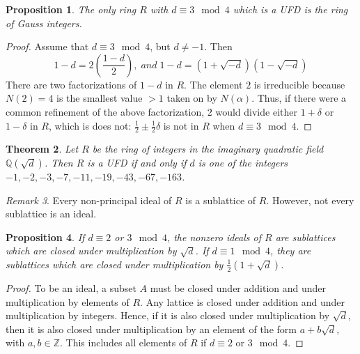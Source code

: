 \documentclass[12pt]{article}
\newtheorem{thm}{Theorem}[section]
\newtheorem{prop}[thm]{Proposition}
\theoremstyle{definition}
\theoremstyle{remark}
\newtheorem{rmk}[thm]{Remark}
\numberwithin{equation}{section}
\newcommand\Z{\mathbb Z}    %
\newcommand\Q{\mathbb Q}    %
\begin{document}
\begin{prop}
        The only ring $R$ with $d\equiv 3 \mod 4$ which is a UFD is the ring of Gauss integers.
\end{prop}
\begin{proof}
        Assume that $d\equiv 3 \mod 4$, but $d \neq -1$. Then \begin{equation}
                1-d = 2\left(\frac{1-d}{2}\right),\;and\; 1-d = (1+\sqrt{-d})(1-\sqrt{-d})
        \end{equation}
        There are two factorizations of $1-d$ in $R$. The element $2$ is irreducible because $N(2) = 4$ is the smallest value $>1$ taken on by $N(\alpha)$. Thus, if there were a common refinement of the above factorization, $2$ would divide either $1+\delta$ or $1-\delta$ in $R$, which is does not: $\frac{1}{2}\pm\frac{1}{2}\delta$ is not in $R$ when $d\equiv 3 \mod 4$.
\end{proof}


\vspace{15pt}

\begin{thm}
        Let $R$ be the ring of integers in the imaginary quadratic field $\Q(\sqrt{d})$. Then $R$ is a UFD if and only if $d$ is one of the integers $-1,-2,-3,-7,-11,-19,-43,-67,-163$.
\end{thm}

\vspace{15pt}

\begin{rmk}
        Every non-principal ideal of $R$ is a sublattice of $R$. However, not every sublattice is an ideal.
\end{rmk}


\vspace{15pt}

\begin{prop}
        If $d \equiv 2$ or $3\mod 4$, the nonzero ideals of $R$ are sublattices which are closed under multiplication by $\sqrt{d}$. If $d \equiv 1 \mod 4$, they are sublattices which are closed under multiplication by $\frac{1}{2}(1+\sqrt{d})$.
\end{prop}
\begin{proof}
        To be an ideal, a subset $A$ must be closed under addition and under multiplication by elements of $R$. Any lattice is closed under addition and under multiplication by integers. Hence, if it is also closed under multiplication by $\sqrt{d}$, then it is also closed under multiplication by an element of the form $a+b\sqrt{d}$, with $a,b \in \Z$. This includes all elements of $R$ if $d \equiv 2$ or $3 \mod 4$. 
\end{proof}
\end{document}
